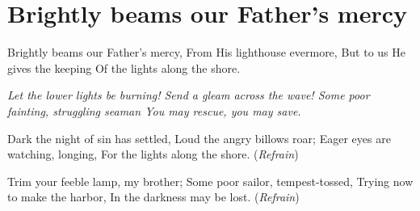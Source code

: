 \starttocol
\chapter{Brightly beams our Father's mercy}
\nexttocol
\hfill{\it }
\stoptocol
\starttocol
\startlines
{\sc Brightly} beams our Father's mercy,
From His lighthouse evermore,
But to us He gives the keeping
Of the lights along the shore.

{\it
Let the lower lights be burning!
Send a gleam across the wave!
Some poor fainting, struggling seaman
You may rescue, you may save.}

 Dark the night of sin has settled,
Loud the angry billows roar;
Eager eyes are watching, longing,
For the lights along the shore.
          \hfill({\it Refrain})~~~~~~~~~

 Trim your feeble lamp, my brother;
Some poor sailor, tempest-tossed,
Trying now to make the harbor,
In the darkness may be lost. 
          \hfill({\it Refrain})~~~~~~~~~
\stoplines
\nexttocol

\stoptocol


